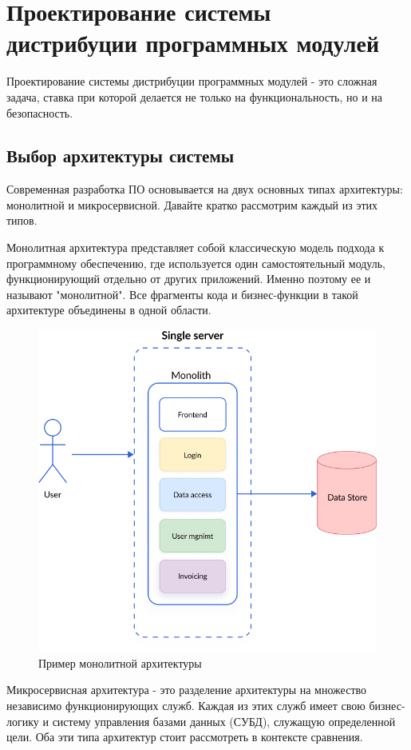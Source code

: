 \chapter{Проектирование системы дистрибуции программных модулей}
\label{cha:design}

Проектирование системы дистрибуции программных модулей - это сложная задача, ставка при которой делается не только на функциональность, но и на безопасность. 

\section{Выбор архитектуры системы}

Современная разработка ПО основывается на двух основных типах архитектуры: монолитной и микросервисной. Давайте кратко рассмотрим каждый из этих типов. 

Монолитная архитектура представляет собой классическую модель подхода к программному обеспечению, где используется один самостоятельный модуль, функционирующий отдельно от других приложений. Именно поэтому ее и называют "монолитной". Все фрагменты кода и бизнес-функции в такой архитектуре объединены в одной области. \cite{arch:monovsmicro}

\begin{figure}
  \centering
  \includegraphics[width=.7\textwidth]{graphics/img/mono.png}
  \caption{Пример монолитной архитектуры}
  \label{fig:mono}
\end{figure}


Микросервисная архитектура - это разделение архитектуры на множество независимо функционирующих служб. Каждая из этих служб имеет свою бизнес-логику и систему управления базами данных (СУБД), служащую определенной цели. Оба эти типа архитектур стоит рассмотреть в контексте сравнения.

